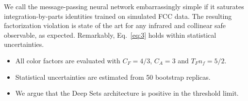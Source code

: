 We call the message-passing neural network embarrassingly simple if it
saturates integration-by-parts identities trained on simulated FCC data.
The resulting factorization violation is state of the art for any
infrared and collinear safe observable, as expected. Remarkably,
Eq.~\eqref{eq:3} holds within statistical uncertainties.

\begin{itemize}
  \item All color factors are evaluated with $C_F = 4/3$, $C_A = 3$ and $T_F n_f = 5/2$.
  \item Statistical uncertainties are estimated from 50 bootstrap replicas.
  \item We argue that the Deep Sets architecture is positive in the threshold limit.
\end{itemize}

